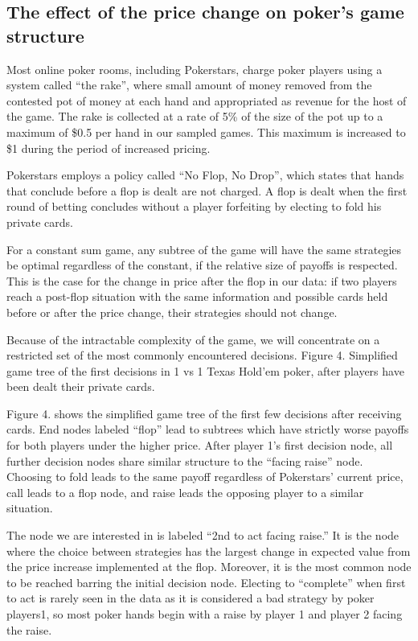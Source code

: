 \documentclass[12pt]{article}
\begin{document}
\subsection{The effect of the price change on poker’s game structure} \label{sec:theory1}

Most online poker rooms, including Pokerstars, charge poker players using a system called “the rake”, where small amount of money removed from the contested pot of money at each hand and appropriated as revenue for the host of the game. The rake is collected at a rate of 5\% of the size of the pot up to a maximum of \$0.5 per hand in our sampled games. This maximum is increased to \$1 during the period of increased pricing.

Pokerstars employs a policy called “No Flop, No Drop”, which states that hands that conclude before a flop is dealt are not charged. A flop is dealt when the first round of betting concludes without a player forfeiting by electing to fold his private cards.

For a constant sum game, any subtree of the game will have the same strategies be optimal regardless of the constant, if the relative size of payoffs is respected. This is the case for the change in price after the flop in our data: if two players reach a post-flop situation with the same information and possible cards held before or after the price change, their strategies should not change.

Because of the intractable complexity of the game, we will concentrate on a restricted set of the most commonly encountered decisions.
Figure 4. Simplified game tree of the first decisions in 1 vs 1 Texas Hold’em poker, after players have been dealt their private cards.

Figure 4. shows the simplified game tree of the first few decisions after receiving cards. End nodes labeled “flop” lead to subtrees which have strictly worse payoffs for both players under the higher price. After player 1’s first decision node, all further decision nodes share similar structure to the “facing raise” node. Choosing to fold leads to the same payoff regardless of Pokerstars’ current price, call leads to a flop node, and raise leads the opposing player to a similar situation.

The node we are interested in is labeled “2nd to act facing raise.” It is the node where the choice between strategies has the largest change in expected value from the price increase implemented at the flop. Moreover, it is the most common node to be reached barring the initial decision node. Electing to “complete” when first to act is rarely seen in the data as it is considered a bad strategy by poker players1, so most poker hands begin with a raise by player 1 and player 2 facing the raise.
\end{document}
